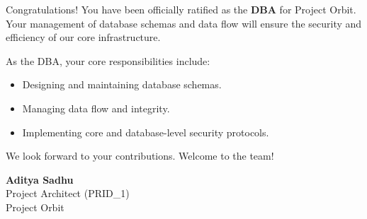 \documentclass[11pt,a4paper]{article}
\begin{document}
\vspace{5mm}

\noindent Congratulations! You have been officially ratified as the \textbf{DBA} for Project Orbit. Your management of database schemas and data flow will ensure the security and efficiency of our core infrastructure.

\vspace{5mm}

\noindent As the DBA, your core responsibilities include:
\begin{itemize}
    \item Designing and maintaining database schemas.
    \item Managing data flow and integrity.
    \item Implementing core and database-level security protocols.
\end{itemize}

\vspace{10mm}

\noindent We look forward to your contributions. Welcome to the team!

\vspace{15mm}

\begin{flushright}
    \textbf{Aditya Sadhu} \\
    Project Architect (PRID\_1) \\
    Project Orbit
\end{flushright}
\end{document}
